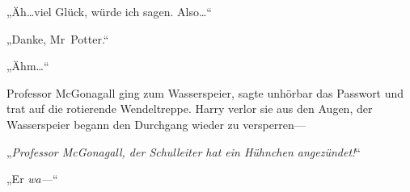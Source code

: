 „Äh…viel Glück, würde ich sagen. Also…“

„Danke, Mr~Potter.“

„Ähm…“

Professor McGonagall ging zum Wasserspeier, sagte unhörbar das Passwort und trat auf die rotierende Wendeltreppe. Harry verlor sie aus den Augen, der Wasserspeier begann den Durchgang wieder zu versperren—

„\emph{Professor McGonagall, der Schulleiter hat ein Hühnchen angezündet!}“

„Er \emph{wa—}“

